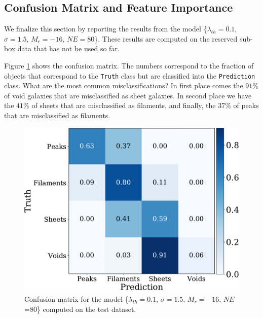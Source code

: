 \documentclass[usenatbib]{mnras}
\begin{document}
\subsection{Confusion Matrix and Feature Importance}

We finalize this section by reporting the results from the model 
\{$\lambda_{th}=0.1$, $\sigma=1.5$, $M_r=-16$, $NE=80$\}.
These results are computed on the reserved sub-box data that has not be used so far.

Figure \ref{fig:confusion_matrix} shows the confusion matrix.
The numbers correspond to the fraction of objects that correspond to
the \verb"Truth" class but are classified into the \verb"Prediction"
class.
What are the most common misclassifications?
In first place comes the $91\%$ of void galaxies that are misclassified
as sheet galaxies.  
In second place we have the $41\%$ of sheets that are misclassified
as filaments, and finally, the $37\%$ of peaks that are misclassified as filaments.

\begin{figure}
\centering
    \includegraphics[scale=0.35]{Figs/p_confusion_matrix_test.pdf}
\caption{Confusion matrix for the model 
      \{$\lambda_{th}=0.1$, $\sigma=1.5$, $M_r=-16$,
      $NE$=80\} computed on the test dataset.}
      \label{fig:confusion_matrix}
\end{figure}
\end{document}

